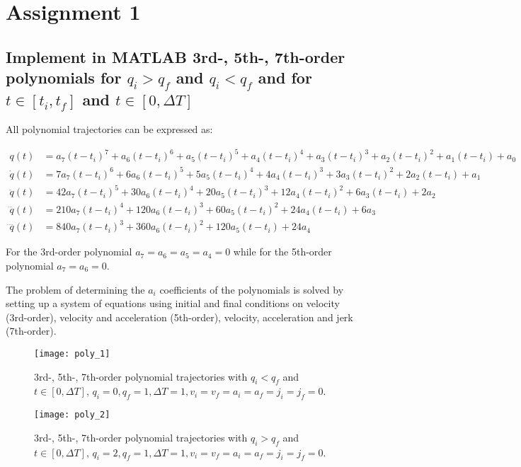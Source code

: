 \section{Assignment 1}

\subsection{Implement in MATLAB 3rd-, 5th-, 7th-order polynomials for $q_i>q_f$ and $q_i<q_f$ and for $t\in [t_i,t_f]$ and $t\in[0,\Delta T]$}

All polynomial trajectories can be expressed as:

\begin{align*}
q(t) &= a_7(t-t_i)^7 + a_6(t-t_i)^6 + a_5(t-t_i)^5 + a_4(t-t_i)^4 + a_3(t-t_i)^3 + a_2(t-t_i)^2 + a_1(t-t_i) + a_0\\
\dot q(t) &= 7a_7(t-t_i)^6 + 6a_6(t-t_i)^5 + 5a_5(t-t_i)^4 + 4a_4(t-t_i)^3 + 3a_3(t-t_i)^2 + 2a_2(t-t_i) + a_1\\
\ddot q(t) &= 42a_7(t-t_i)^5 + 30a_6(t-t_i)^4+20a_5(t-t_i)^3 + 12a_4(t-t_i)^2 + 6a_3(t-t_i) + 2a_2\\
\dddot q(t) &= 210a_7(t-t_i)^4 + 120a_6(t-t_i)^3+60a_5(t-t_i)^2 + 24a_4(t-t_i) + 6a_3\\
\ddddot q(t) &= 840a_7(t-t_i)^3 + 360a_6(t-t_i)^2+120a_5(t-t_i) + 24a_4
\end{align*}

For the 3rd-order polynomial $a_7=a_6=a_5=a_4=0$ while for the 5th-order polynomial $a_7=a_6=0$.

The problem of determining the $a_i$ coefficients of the polynomials is solved by setting up a system of equations using initial and final conditions on velocity (3rd-order), velocity and acceleration (5th-order), velocity, acceleration and jerk (7th-order).

\begin{figure}[H]
\centering
\texttt{[image: poly\_1]}
\caption{3rd-, 5th-, 7th-order polynomial trajectories with $q_i<q_f$ and $t\in[0,\Delta T]$, $q_i=0,q_f=1,\Delta T=1, v_i=v_f=a_i=a_f=j_i=j_f=0$.}
\label{fig:poly_1}
\end{figure}

\begin{figure}[H]
\centering
\texttt{[image: poly\_2]}
\caption{3rd-, 5th-, 7th-order polynomial trajectories with $q_i>q_f$ and $t\in[0,\Delta T]$, $q_i=2,q_f=1,\Delta T=1, v_i=v_f=a_i=a_f=j_i=j_f=0$.}
\label{fig:poly_2}
\end{figure}

